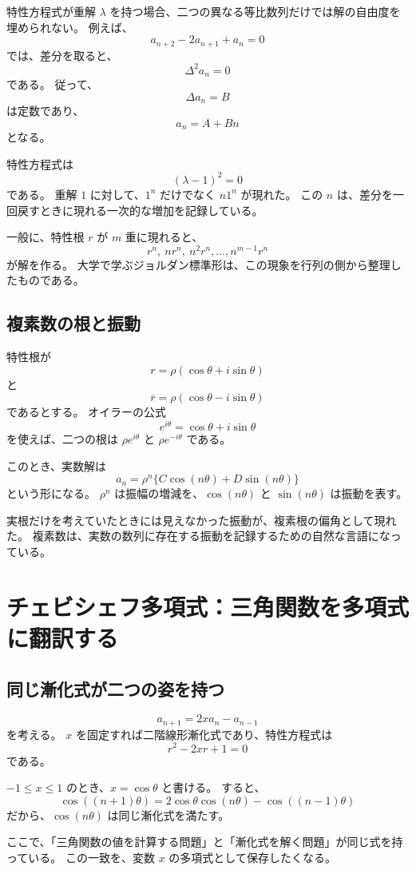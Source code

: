 特性方程式が重解 $\lambda$ を持つ場合、二つの異なる等比数列だけでは解の自由度を埋められない。
例えば、
\[
  a_{n+2}-2a_{n+1}+a_n=0
\]
では、差分を取ると、
\[
  \Delta^2a_n=0
\]
である。
従って、
\[
  \Delta a_n=B
\]
は定数であり、
\[
  a_n=A+Bn
\]
となる。

特性方程式は
\[
  (\lambda-1)^2=0
\]
である。
重解 $1$ に対して、$1^n$ だけでなく $n1^n$ が現れた。
この $n$ は、差分を一回戻すときに現れる一次的な増加を記録している。

一般に、特性根 $r$ が $m$ 重に現れると、
\[
  r^n,\ nr^n,\ n^2r^n,\ldots,n^{m-1}r^n
\]
が解を作る。
大学で学ぶジョルダン標準形は、この現象を行列の側から整理したものである。

\subsection{複素数の根と振動}

特性根が
\[
  r=\rho(\cos\theta+i\sin\theta)
\]
と
\[
  \overline r=\rho(\cos\theta-i\sin\theta)
\]
であるとする。
オイラーの公式
\[
  e^{i\theta}=\cos\theta+i\sin\theta
\]
を使えば、二つの根は $\rho e^{i\theta}$ と $\rho e^{-i\theta}$ である。

このとき、実数解は
\[
  a_n=\rho^n\{C\cos(n\theta)+D\sin(n\theta)\}
\]
という形になる。
$\rho^n$ は振幅の増減を、$\cos(n\theta)$ と $\sin(n\theta)$ は振動を表す。

実根だけを考えていたときには見えなかった振動が、複素根の偏角として現れた。
複素数は、実数の数列に存在する振動を記録するための自然な言語になっている。

\section{チェビシェフ多項式：三角関数を多項式に翻訳する}

\subsection{同じ漸化式が二つの姿を持つ}

\[
  a_{n+1}=2x a_n-a_{n-1}
\]
を考える。
$x$ を固定すれば二階線形漸化式であり、特性方程式は
\[
  r^2-2xr+1=0
\]
である。

$-1\leq x\leq1$ のとき、$x=\cos\theta$ と書ける。
すると、
\[
  \cos((n+1)\theta)
  =
  2\cos\theta\cos(n\theta)-\cos((n-1)\theta)
\]
だから、$\cos(n\theta)$ は同じ漸化式を満たす。

ここで、「三角関数の値を計算する問題」と「漸化式を解く問題」が同じ式を持っている。
この一致を、変数 $x$ の多項式として保存したくなる。


